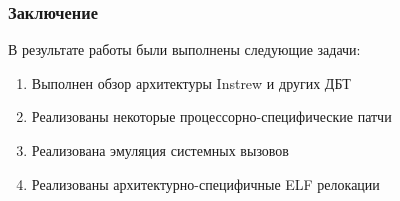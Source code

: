 \documentclass{beamer}
\begin{document}


\begin{frame}
  \frametitle{Заключение}
  В результате работы были выполнены следующие задачи:
  \vspace{8pt}
  \begin{enumerate}
    \item Выполнен обзор архитектуры Instrew и других ДБТ
    \item Реализованы некоторые процессорно-специфические патчи
    \item Реализована эмуляция системных вызовов
    \item Реализованы архитектурно-специфичные ELF релокации
  \end{enumerate}
  \vspace{8pt}

\end{frame}

\appendix


\end{document}
